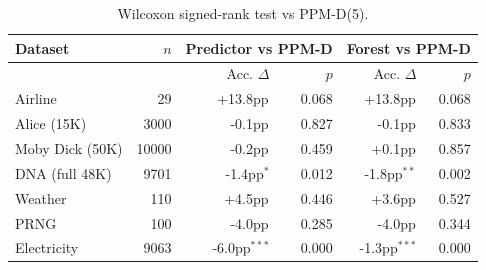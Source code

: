 \begin{table}[h]
\centering
\caption{Wilcoxon signed-rank test vs PPM-D(5).}
\label{tab:significance}
\begin{tabular}{l r rr rr}
\toprule
Dataset & $n$ & \multicolumn{2}{c}{Predictor vs PPM-D} & \multicolumn{2}{c}{Forest vs PPM-D} \\
\midrule
 & & Acc. $\Delta$ & $p$ & Acc. $\Delta$ & $p$ \\
\midrule
Airline & 29 & +13.8pp$^{}$ & 0.068 & +13.8pp$^{}$ & 0.068 \\
Alice (15K) & 3000 & -0.1pp$^{}$ & 0.827 & -0.1pp$^{}$ & 0.833 \\
Moby Dick (50K) & 10000 & -0.2pp$^{}$ & 0.459 & +0.1pp$^{}$ & 0.857 \\
DNA (full 48K) & 9701 & -1.4pp$^{*}$ & 0.012 & -1.8pp$^{**}$ & 0.002 \\
Weather & 110 & +4.5pp$^{}$ & 0.446 & +3.6pp$^{}$ & 0.527 \\
PRNG & 100 & -4.0pp$^{}$ & 0.285 & -4.0pp$^{}$ & 0.344 \\
Electricity & 9063 & -6.0pp$^{***}$ & 0.000 & -1.3pp$^{***}$ & 0.000 \\
\bottomrule
\end{tabular}
\end{table}
